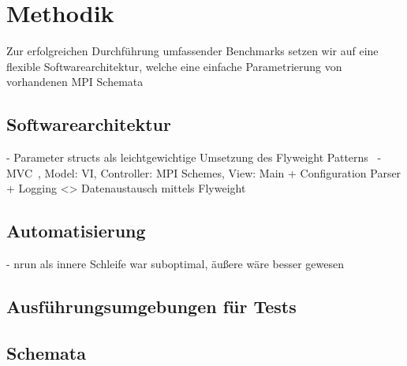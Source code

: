 \section{Methodik}
\label{sec:methodik}

Zur erfolgreichen Durchführung umfassender Benchmarks setzen wir auf eine flexible Softwarearchitektur, welche eine einfache Parametrierung von vorhandenen MPI Schemata

\subsection{Softwarearchitektur}
- Parameter structs als leichtgewichtige Umsetzung des Flyweight Patterns~\citep{gamma1995design}
- MVC~\citep{buschmann1996pattern-oriented}, Model: VI, Controller: MPI Schemes, View: Main + Configuration Parser + Logging <> Datenaustausch mittels Flyweight

\subsection{Automatisierung}
- nrun als innere Schleife war suboptimal, äußere wäre besser gewesen

\subsection{Ausführungsumgebungen für Tests}

\subsection{Schemata}

